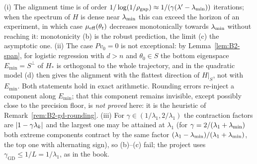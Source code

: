 \begin{remark}\label{rem:B2-gd-scope}
(i) The alignment time is of order $1/\log(1/\rho_{\mathrm{gap}})\approx1/(\gamma(\lambda'-\lambda_{\min}))$ iterations;
when the spectrum of $H$ is dense near $\lambda_{\min}$ this can exceed the horizon of an experiment, in which case
$\mu_{\mathrm{eff}}(\theta_t)$ decreases monotonically towards $\lambda_{\min}$ without reaching it: monotonicity (b) is the
robust prediction, the limit (c) the asymptotic one. (ii) The case $Pv_0=0$ is not exceptional: by
Lemma~\ref{lem:B2-span}, for logistic regression with $d>n$ and $\theta_0\in S$ the bottom eigenspace $E_{\min}=S^\perp$
of $H_\ast$ is orthogonal to the whole trajectory, and in the quadratic model (d) then gives the alignment with the
flattest direction of $H|_S$, not with $E_{\min}$. Both statements hold in exact arithmetic. Rounding errors re-inject a
component along $E_{\min}$; that this component remains invisible, except possibly close to the precision floor, is
\emph{not proved} here: it is the heuristic of Remark~\ref{rem:B2-gd-rounding}. (iii) For
$\gamma\in(1/\lambda_1,2/\lambda_1)$ the contraction factors are $\left|1-\gamma\lambda_k\right|$ and the largest one may
be attained at $\lambda_1$ (for $\gamma=2/(\lambda_1+\lambda_{\min})$ both extreme components contract by the same factor
$(\lambda_1-\lambda_{\min})/(\lambda_1+\lambda_{\min})$, the top one with alternating sign), so (b)--(c)
fail; the project uses $\gamma_{\mathrm{GD}}\le1/L=1/\lambda_1$, as in the book.
\end{remark}

